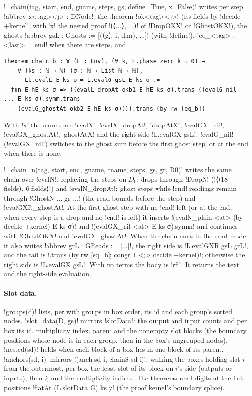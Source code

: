 {{{\lexpy!_chain(tag, start, end, gname, steps, gs, define=True, x=False)! writes per step
\lexlean!abbrev x<tag><j> : DNode!, the theorem \lexlean!ok<tag><j>! (its fields by
\lexlean!decide +kernel!; with \lexcode!x! the nested proof \lexlean!⟨⟨...⟩, ...⟩! of \lexlean!DropOKX! or
\lexlean!GhostOKX!), the ghosts \lexlean!abbrev gsL : Ghosts := [(⟨g⟩, i, dim), ...]! (with
\lexcode!define!), \lexlean!eq_<tag> : <last> = end! when there are steps, and
\begin{lstlisting}[style=lexlean]
theorem chain_b : ∀ (E : Env), (∀ k, E.phase zero k = 0) →
    ∀ (ks : ℕ → ℕ) (σ : ℕ → List ℕ → ℕ),
      Lb.evalL E ks σ = L.evalG gsL E ks σ :=
  fun E hE ks σ => ((evalL_dropAt okb1 E hE ks σ).trans ((evalG_nil ... E ks σ).symm.trans
    (evalG_ghostAt okb2 E hE ks σ)))).trans (by rw [eq_b])
\end{lstlisting}
With \lexcode!x! the names are \lexlean!evalX!, \lexlean!evalX_dropAt!, \lexlean!dropAtX!,
\lexlean!evalGX_nil!, \lexlean!evalGX_ghostAt!, \lexlean!ghostAtX! and the right side
\lexlean!L.evalGX gsL!. \lexlean!evalG_nil! (\lexlean!evalGX_nil!) switches to the ghost sum before the
first ghost step, or at the end when there is none.

\lexpy!_chain_n(tag, start, end, gname, rname, steps, gs, gr, D0)! writes the same chain over
\lexlean!evalN!, replaying the steps on $D_0$: drops through \lexlean!DropN!
(\lexlean!⟨⟨18 fields⟩, 6 fields⟩!) and \lexlean!evalN_dropAt!; ghost steps while \lexcode!cnd! readings
remain through \lexlean!GhostN ... gr ...! (the read bounds before the step) and
\lexlean!evalGXR_ghostAt!. At the first ghost step with no \lexcode!cnd! left (or at the end, when every
step is a drop and no \lexcode!cnd! is left) it inserts
\lexlean!(evalN_plain <at> (by decide +kernel) E ks σ)! and \lexlean!(evalGX_nil <at> E ks σ).symm!
and continues with \lexlean!GhostOKX! and \lexlean!evalGX_ghostAt!. When the chain ends in the read
mode it also writes \lexlean!abbrev grL : GReads := [...]!, the right side is
\lexlean!L.evalGXR gsL grL!, and the tail is \lexlean!.trans (by rw [eq_b]; congr 1 <;> decide +kernel)!;
otherwise the right side is \lexlean!L.evalGX gsL!. With no terms the body is \lexlean!rfl!. It returns
the text and the right-side evaluation.

\paragraph{Slot data.} \lexpy!groups(d)! lists, per \bbox with groups in box order, its id and each
group's sorted nodes. \lexpy!slot_data(D, gs)! mirrors \lexlean!slotData!: the output and input counts
and per box its id, multiplicity index, parent and the nonempty slot blocks (the boundary
positions whose node is in each group, then in the box's ungrouped nodes). \lexpy!nested(sd)! holds
when each block of a box lies in one block of its parent. \lexpy!anchors(sd, i)! mirrors
\lexlean!(anch sd i, chainS sd i)!: walking the boxes holding slot $i$ from the outermost, per box the
least slot of its block on $i$'s side (outputs or inputs), then $i$; and the multiplicity indices.
The theorems read digits at the flat positions \lexlean!flatAt (L.slotData G) ks y! (the proof
kernel's boundary splice).

}}}
